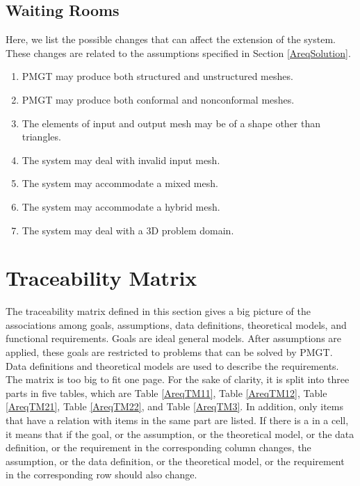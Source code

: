 \documentclass[12pt,titlepage]{article}
\begin{document}
\subsection{Waiting Rooms}
Here, we list the possible changes that can affect the extension of the system. These changes are related to the assumptions specified in Section \ref{AreqSolution}.
\begin{enumerate}
\item PMGT may produce both structured and unstructured meshes.
\item PMGT may produce both conformal and nonconformal meshes.
\item The elements of input and output mesh may be of a shape other than triangles.
\item The system may deal with invalid input mesh.
\item The system may accommodate a mixed mesh.
\item The system may accommodate a hybrid mesh.
\item The system may deal with a 3D problem domain.
\end{enumerate}
\section{Traceability Matrix \label{AreqSecTM}}
The traceability matrix defined in this section gives a big picture of the associations among goals, assumptions, data definitions, theoretical models, and functional requirements. Goals are ideal general models. After assumptions are applied, these goals are restricted to problems that can be solved by PMGT. Data definitions and theoretical models are used to describe the requirements. The matrix is too big to fit one page. For the sake of clarity, it is split into three parts in five tables, which are Table \ref{AreqTM11}, Table \ref{AreqTM12}, Table \ref{AreqTM21}, Table \ref{AreqTM22}, and Table \ref{AreqTM3}. In addition, only items that have a relation with items in the same part are listed. If there is a \checkmark in a cell, it means that if the goal, or the assumption, or the theoretical model, or the data definition, or the requirement in the corresponding column changes, the assumption, or the data definition, or the theoretical model, or the requirement in the corresponding row should also change.
\end{document}
